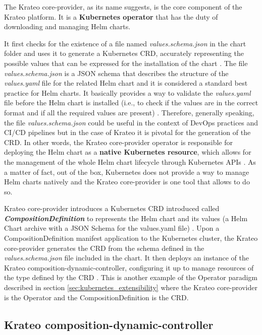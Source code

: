 The Krateo core-provider, as its name suggests, is the core component of the Krateo platform.
It is a \textbf{Kubernetes operator} that has the duty of downloading and managing Helm charts. 

It first checks for the existence of a file named \textit{values.schema.json} in the chart folder and uses it to generate a Kubernetes CRD, accurately representing the possible values that can be expressed for the installation of the chart \cite{krateo_core_provider}.
The file \textit{values.schema.json} is a JSON schema that describes the structure of the \textit{values.yaml} file for the related Helm chart and it is considered a standard best practice for Helm charts. 
It basically provides a way to validate the \textit{values.yaml} file before the Helm chart is installed (i.e., to check if the values are in the correct format and if all the required values are present) \cite{krateo_core_provider}.
Therefore, generally speaking, the file \textit{values.schema.json} could be useful in the context of DevOps practices and CI/CD pipelines but in the case of Krateo it is pivotal for the generation of the CRD.
In other words, the Krateo core-provider operator is responsible for deploying the Helm chart as a \textbf{native Kubernetes resource}, which allows for the management of the whole Helm chart lifecycle through Kubernetes APIs \cite{krateo_core_provider}.
As a matter of fact, out of the box, Kubernetes does not provide a way to manage Helm charts natively and the Krateo core-provider is one tool that allows to do so.

Krateo core-provider introduces a Kubernetes CRD introduced called \textbf{\textit{CompositionDefinition}} to represents the Helm chart and its values (a Helm Chart archive with a JSON Schema for the values.yaml file) \cite{krateo_core_provider}.
Upon a CompositionDefinition manifest application to the Kubernetes cluster, the Krateo core-provider generates the CRD from the schema defined in the \textit{values.schema.json} file included in the chart. 
It then deploys an instance of the Krateo composition-dynamic-controller, configuring it up to manage resources of the type defined by the CRD \cite{krateo_core_provider}.
This is another example of the Operator paradigm described in section \ref{sec:kubernetes_extensibility} where the Krateo core-provider is the Operator and the CompositionDefinition is the CRD.

\subsection{Krateo composition-dynamic-controller}

